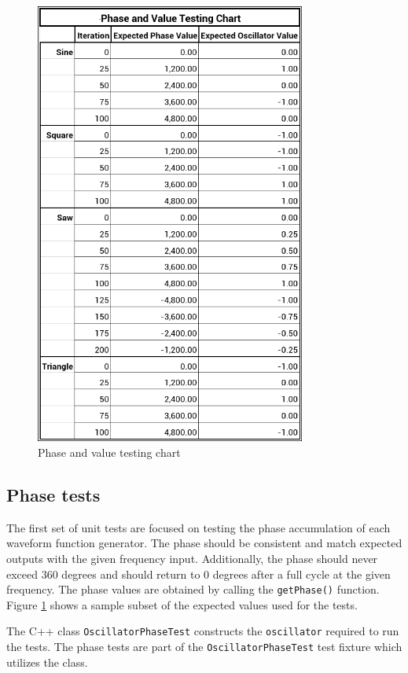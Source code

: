 \documentclass[a4paper,12pt]{report}
\begin{document}
\begin{figure}[h]
    \centering
    \includegraphics[width=24em]{Phase Value Testing Chart.png}
    \caption{Phase and value testing chart}
    \label{fig:testingchart}
\end{figure}

\subsection{Phase tests}
\label{subsec:phasetests}
The first set of unit tests are focused on testing the phase accumulation of each waveform function generator. The phase should be consistent and match expected outputs with the given frequency input. Additionally, the phase should never exceed 360 degrees and should return to 0 degrees after a full cycle at the given frequency. The phase values are obtained by calling the \texttt{getPhase()} function. Figure \ref{fig:testingchart} shows a sample subset of the expected values used for the tests.

The C++ class \texttt{Oscillator\-Phase\-Test} constructs the \texttt{oscillator} required to run the tests. The phase tests are part of the \texttt{Oscillator\-Phase\-Test} test fixture which utilizes the class.
\end{document}
